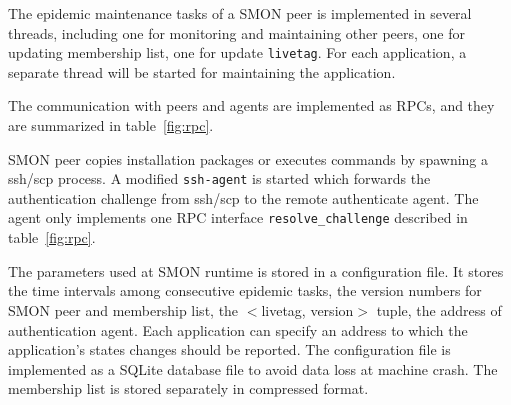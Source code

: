The epidemic maintenance tasks of a SMON peer is implemented in
several
threads, including one for monitoring and maintaining other
peers, one for updating membership list, one for update
\texttt{livetag}. For each application, a separate thread
will be started for maintaining the application.

The communication with peers and agents are implemented as
RPCs, and they are summarized in table~\ref{fig:rpc}.


SMON peer copies installation packages or executes commands
by spawning a ssh/scp process. A modified \texttt{ssh-agent}
is started which forwards the authentication challenge from
ssh/scp to the remote authenticate agent. The agent only
implements one RPC interface \texttt{resolve\_challenge}
described in table~\ref{fig:rpc}.

The parameters used at SMON runtime is stored in a
configuration file. It stores the time intervals among
consecutive epidemic tasks, the version numbers for SMON
peer and membership list, the $<$livetag, version$>$ tuple,
the address of authentication agent. Each application can
specify an address to which the application's states changes
should be reported. The configuration file is implemented as
a SQLite database file to avoid data loss at machine crash.
The membership list is stored separately in compressed
format.



